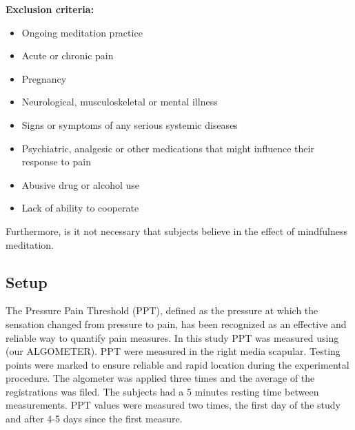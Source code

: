 \textbf{Exclusion criteria:}
\vspace{-.5cm}
\begin{itemize}
	\item Ongoing meditation practice 
	\vspace{-.3cm}
	\item Acute or chronic pain
	\vspace{-.3cm}
	\item Pregnancy 
	\vspace{-.3cm}
	\item Neurological, musculoskeletal or mental illness
	\vspace{-.3cm}
	\item Signs or symptoms of any serious systemic diseases 
	\vspace{-.3cm}
	\item Psychiatric, analgesic or other medications that might influence their response to pain 
		\vspace{-.3cm}
	\item Abusive drug or alcohol use
		\vspace{-.3cm}
	\item Lack of ability to cooperate
\end{itemize}

\vspace{-.5cm}
Furthermore, is it not necessary that subjects believe in the effect of mindfulness meditation.

\subsection{Setup}
The Pressure Pain Threshold (PPT), defined as the pressure at which the sensation changed from pressure to pain, has been recognized as an effective and reliable way to quantify pain measures. In this study PPT was measured using (our ALGOMETER). PPT were measured in the right media scapular. Testing points were marked to ensure reliable and rapid location during the experimental procedure. 
The algometer was applied three times and the average of the registrations was filed. The subjects had a 5 minutes resting time between measurements. PPT values were measured two times, the first day of the study and after 4-5 days since the first measure.

